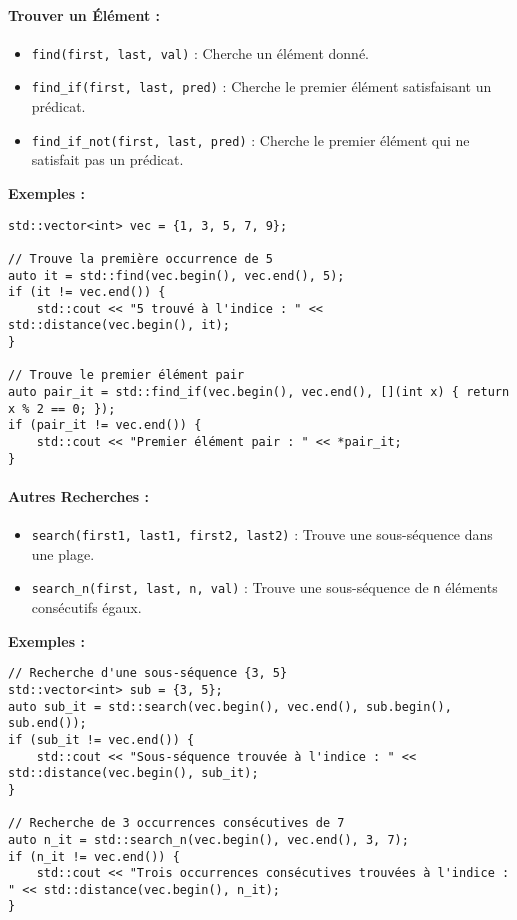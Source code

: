 \paragraph{Trouver un Élément :}
\begin{itemize}
    \item \texttt{find(first, last, val)} : Cherche un élément donné.
    \item \texttt{find\_if(first, last, pred)} : Cherche le premier élément satisfaisant un prédicat.
    \item \texttt{find\_if\_not(first, last, pred)} : Cherche le premier élément qui ne satisfait pas un prédicat.
\end{itemize}

\textbf{Exemples :}
\begin{tcolorbox}[colframe=blue!50!black, colback=blue!5!white, title=Exemples de Recherche d'Élément]
\begin{verbatim}
std::vector<int> vec = {1, 3, 5, 7, 9};

// Trouve la première occurrence de 5
auto it = std::find(vec.begin(), vec.end(), 5);
if (it != vec.end()) {
    std::cout << "5 trouvé à l'indice : " << std::distance(vec.begin(), it);
}

// Trouve le premier élément pair
auto pair_it = std::find_if(vec.begin(), vec.end(), [](int x) { return x % 2 == 0; });
if (pair_it != vec.end()) {
    std::cout << "Premier élément pair : " << *pair_it;
}
\end{verbatim}
\end{tcolorbox}

\paragraph{Autres Recherches :}
\begin{itemize}
    \item \texttt{search(first1, last1, first2, last2)} : Trouve une sous-séquence dans une plage.
    \item \texttt{search\_n(first, last, n, val)} : Trouve une sous-séquence de \texttt{n} éléments consécutifs égaux.
\end{itemize}

\textbf{Exemples :}
\begin{tcolorbox}[colframe=blue!50!black, colback=blue!5!white, title=Exemples de Recherche Avancée]
\begin{verbatim}
// Recherche d'une sous-séquence {3, 5}
std::vector<int> sub = {3, 5};
auto sub_it = std::search(vec.begin(), vec.end(), sub.begin(), sub.end());
if (sub_it != vec.end()) {
    std::cout << "Sous-séquence trouvée à l'indice : " << std::distance(vec.begin(), sub_it);
}

// Recherche de 3 occurrences consécutives de 7
auto n_it = std::search_n(vec.begin(), vec.end(), 3, 7);
if (n_it != vec.end()) {
    std::cout << "Trois occurrences consécutives trouvées à l'indice : " << std::distance(vec.begin(), n_it);
}
\end{verbatim}
\end{tcolorbox}

